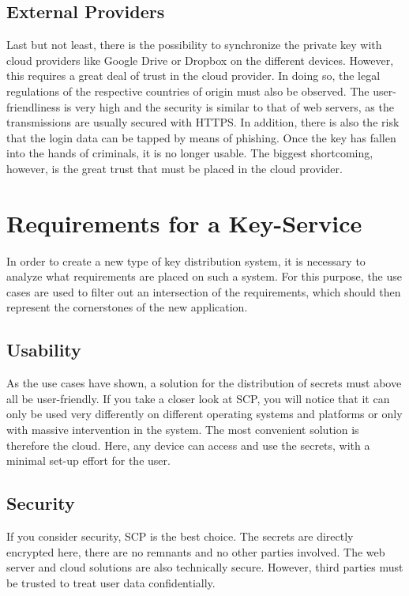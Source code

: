 \documentclass[12pt,oneside,a4paper,parskip]{scrbook}
\begin{document}
\subsection{External Providers}
Last but not least, there is the possibility to synchronize the private key with cloud providers like Google Drive or Dropbox on the different devices. However, this requires a great deal of trust in the cloud provider. In doing so, the legal regulations of the respective countries of origin must also be observed. \parencite{heise_us_nodate} \newline
The user-friendliness is very high and the security is similar to that of web servers, as the transmissions are usually secured with HTTPS. In addition, there is also the risk that the login data can be tapped by means of phishing. Once the key has fallen into the hands of criminals, it is no longer usable. The biggest shortcoming, however, is the great trust that must be placed in the cloud provider. 


\section{Requirements for a Key-Service}
In order to create a new type of key distribution system, it is necessary to analyze what requirements are placed on such a system. For this purpose, the use cases are used to filter out an intersection of the requirements, which should then represent the cornerstones of the new application.

\subsection{Usability}
As the use cases have shown, a solution for the distribution of secrets must above all be user-friendly. If you take a closer look at SCP, you will notice that it can only be used very differently on different operating systems and platforms or only with massive intervention in the system. The most convenient solution is therefore the cloud. Here, any device can access and use the secrets, with a minimal set-up effort for the user.

\subsection{Security}
If you consider security, SCP is the best choice. The secrets are directly encrypted here, there are no remnants and no other parties involved. The web server and cloud solutions are also technically secure. However, third parties must be trusted to treat user data confidentially.
\end{document}

